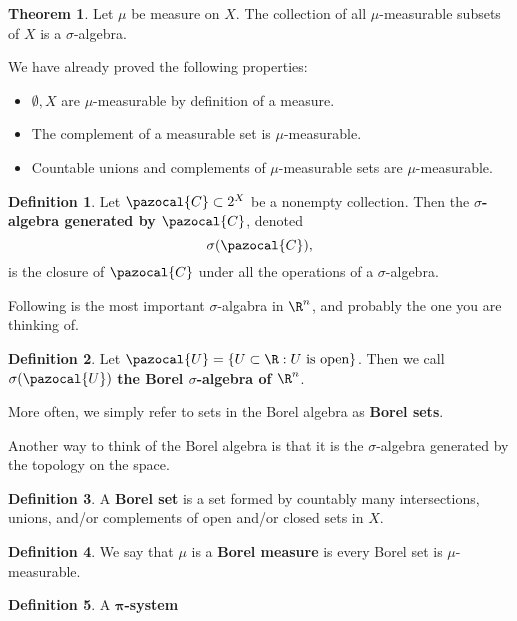 \documentclass[a5paper]{article}
\makeatletter
\theoremstyle{definition}%
\newtheorem*{theorem*}{Theorem} %
\newtheorem*{definition*}{Definition}
\numberwithin{exercise}{section}
\theoremstyle{remark}%
\newcommand{\mumeasurable}{$\mu$-measurable}
\renewcommand{\script}[1]{\pazocal{#1}}
\renewenvironment{proof}{{Proof.}}{\qed}
\renewenvironment{proof}[1][\proofname.]{\par
  \pushQED{\qed}%
  \normalfont \topsep6\p@\@plus6\p@\relax
  \trivlist
  \item[\hskip\labelsep
        \scshape
    #1\@addpunct{}]\ignorespaces
}{%
  \popQED\endtrivlist\@endpefalse
}
\makeatother
\begin{document}
\begin{theorem*}
Let $\mu$ be  measure on $X$. The collection of all \mumeasurable{} subsets of $X$ is a $\sigma$-algebra. 
\end{theorem*}
\begin{proof} We have already proved the following properties:
\begin{itemize}
\item $\emptyset, X$ are \mumeasurable{} by definition of a measure. 
\item The complement of a measurable set is \mumeasurable{}.
\item Countable unions and complements of \mumeasurable{} sets are \mumeasurable{}. 
\end{itemize}
\end{proof}

\begin{highlight}
\begin{definition*}
Let $\script{C}\subset2^X$ be a nonempty collection. Then the \textbf{$\sigma$-algebra generated by $\script{C}$}, denoted 
$$\sigma(\script{C}),$$
is the closure of $\script{C}$ under all the operations of a $\sigma$-algebra.
\end{definition*}
\end{highlight}

Following is the most important $\sigma$-algabra in $\R^n$, and probably the one you are thinking of. 

\begin{highlight}
\begin{definition*}
Let $\script{U}=\{U\subset\R : U \text{ is open}\}$. Then we call $\sigma(\script{U})$ \textbf{the Borel $\sigma$-algebra of $\R^n$}. 

More often, we simply refer to sets in the Borel algebra as \textbf{Borel sets}. 
\end{definition*}
\end{highlight}

Another way to think of the Borel algebra is that it is the $\sigma$-algebra generated by the topology on the space.

\begin{highlight}
\begin{definition*}
A \textbf{Borel set} is a set formed by countably many intersections, unions, and/or complements of open and/or closed sets in $X$.
\end{definition*}
\end{highlight}

\begin{highlight}
\begin{definition*}
We say that $\mu$ is a \textbf{Borel measure} is every Borel set is \mumeasurable{}.
\end{definition*}
\end{highlight}

\begin{definition*}
A \textbf{$\bm\pi$-system}
\end{definition*}

\end{document}
